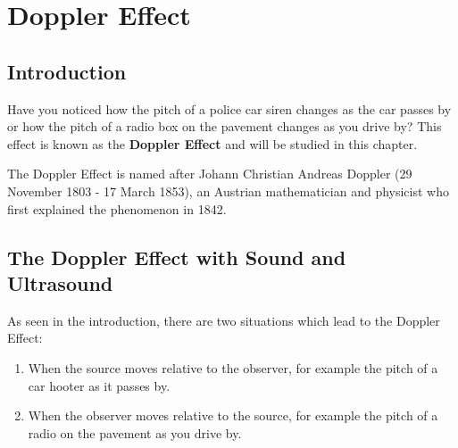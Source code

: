 \chapter{Doppler Effect}
\label{p:wsl:de12}


\section{Introduction}
Have you noticed how the pitch of a police car siren changes as the car passes by or how the pitch of a radio box on the pavement changes as you drive by? This effect is known as the \textbf{Doppler Effect} and will be studied in this chapter.
\begin{IFact}
{The Doppler Effect is named after Johann Christian Andreas Doppler (29 November 1803 - 17 March 1853), an Austrian mathematician and physicist who first explained the phenomenon in 1842.}
\end{IFact}

\section{The Doppler Effect with Sound and Ultrasound}

As seen in the introduction, there are two situations which lead to the Doppler  Effect:
\begin{enumerate}
\item{When the source moves relative to the observer, for example the pitch of a car hooter as it passes by.}
\item{When the observer moves relative to the source, for example the pitch of a radio on the pavement as you drive by.}
\end{enumerate}


